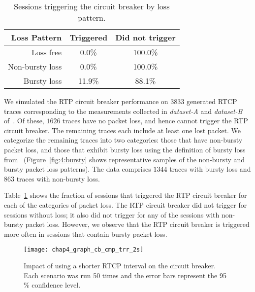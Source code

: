 \begin{table}
  \begin{center}
    \begin{tabular}{rcc}
    \toprule
      \textbf{Loss Pattern}   & \textbf{Triggered} & \textbf{Did not trigger} \\
    \midrule
             Loss free &   0.0\% & 100.0\% \\
       Non-bursty loss &   0.0\% & 100.0\% \\
          Bursty loss  &  11.9\% &  88.1\% \\
    \bottomrule
    \end{tabular}
    \caption{Sessions triggering the circuit breaker by loss pattern.}
    \label{tab:4:cb_bursty}
  \end{center}
\end{table}

We simulated the RTP circuit breaker performance on $3833$ generated RTCP traces
corresponding to the measurements collected in \emph{dataset-A} and
\emph{dataset-B} of~\cite{ellis:2011:dataset}. Of these, $1626$ traces have no
packet loss, and hence cannot trigger the RTP circuit breaker. The remaining
traces each include at least one lost packet. We categorize the remaining
traces into two categories: those that have non-bursty packet loss, and those
that exhibit bursty loss using the definition of bursty loss
from~\cite{rfc3611} (Figure~\ref{fig:4:bursty} shows representative samples of
the non-bursty and bursty packet loss patterns). The data comprises $1344$
traces with bursty loss and $863$ traces with non-bursty loss.



Table~\ref{tab:4:cb_bursty} shows the fraction of sessions that triggered the
RTP circuit breaker for each of the categories of packet loss. The RTP circuit
breaker did not trigger for sessions without loss; it also did not trigger for
any of the sessions with non-bursty packet loss. However, we observe that the
RTP circuit breaker is triggered more often in sessions that contain bursty
packet loss. 

\begin{figure}[!t]
  \centerline{
    {\texttt{[image: chap4\_graph\_cb\_cmp\_trr\_2s]}}
  }
  \caption{Impact of using a shorter RTCP interval on the
  circuit breaker. Each scenario was run 50 times and the error bars represent
  the 95\,\% confidence level.}
  \label{fig:4:short-rtcp}
\end{figure}

